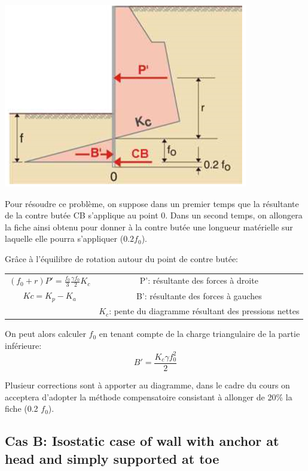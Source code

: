 \begin{center}
\includegraphics [scale=0.8]{pictures/36.PNG}
\end{center}

Pour résoudre ce problème, on suppose dans un premier temps que la résultante de la contre butée CB s'applique au point 0. Dans un second temps, on allongera la fiche ainsi obtenu pour donner à la contre butée une longueur matérielle sur laquelle elle pourra s'appliquer ($0.2f_0$).

Grâce à l'équilibre de rotation autour du point de contre butée:

\begin{center}
\begin{tabular}{c|c}
    $(f_0 + r)P' = \frac{f_0}{3}\frac{\gamma f_0}{2} K_c$    
                        &  P': résultante des forces à droite \\
    $Kc = K_p - K_a$    &  B': résultante des forces à gauches \\
                        &  $K_c$: pente du diagramme résultant des pressions nettes
\end{tabular}
\end{center}

\medskip
On peut alors calculer $f_0$ en tenant compte de la charge triangulaire de la partie inférieure:
$$ B'=\frac{K_c \gamma f_0^2}{2}$$

Plusieur corrections sont à apporter au diagramme, dans le cadre du cours on acceptera d'adopter la méthode compensatoire consistant à allonger de 20\% la fiche (0.2 $f_0$).

\subsection{Cas B: Isostatic case of wall with anchor at head and simply supported at toe}

